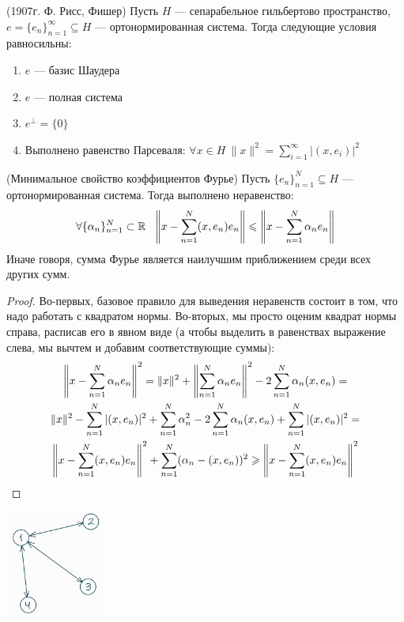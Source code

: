 \begin{theorem} (1907г. Ф. Рисс, Фишер)
	Пусть $H$ --- сепарабельное гильбертово пространство, $e = \{e_n\}_{n = 1}^\infty \subseteq H$ --- ортонормированная система. Тогда следующие условия равносильны:
	\begin{enumerate}
		\item $e$ --- базис Шаудера
		
		\item $e$ --- полная система
		
		\item $e^\bot = \{0\}$
		
		\item Выполнено равенство Парсеваля: $\forall x \in H\ \|x\|^2 = \sum_{i = 1}^\infty |(x, e_i)|^2$
	\end{enumerate}
\end{theorem}

\begin{lemma} (Минимальное свойство коэффициентов Фурье)
	Пусть $\{e_n\}_{n = 1}^N \subseteq H$ --- ортонормированная система. Тогда выполнено неравенство:
	\[
	\forall \{\alpha_n\}_{n = 1}^N \subset \R\ \ \no{x - \sum_{n = 1}^N (x, e_n)e_n} \le \no{x - \sum_{n = 1}^N \alpha_n e_n}
	\]
	Иначе говоря, сумма Фурье является наилучшим приближением среди всех других сумм.
\end{lemma}

\begin{proof}
	Во-первых, базовое правило для выведения неравенств состоит в том, что надо работать с квадратом нормы. Во-вторых, мы просто оценим квадрат нормы справа, расписав его в явном виде (а чтобы выделить в равенствах выражение слева, мы вычтем и добавим соответствующие суммы):
	\begin{multline*}
	\left\|x - \sum_{n = 1}^N \alpha_n e_n\right\|^2 = \|x\|^2 + \left\|\sum_{n = 1}^N \alpha_n e_n\right\|^2 - 2\sum_{n = 1}^N \alpha_n (x, e_n) =
	\\
	\|x\|^2 - \sum_{n = 1}^N |(x, e_n)|^2 + \sum_{n = 1}^N \alpha_n^2 - 2\sum_{n = 1}^N \alpha_n(x, e_n) + \sum_{n = 1}^N |(x, e_n)|^2 =
	\\
	\left\|x - \sum_{n = 1}^N (x, e_n)e_n\right\|^2 + \sum_{n = 1}^N (\alpha_n - (x, e_n))^2 \geqslant \left\|x - \sum_{n = 1}^N (x, e_n)e_n\right\|^2
	\end{multline*}
\end{proof}

\begin{center}
	\includegraphics[width=0.25\textwidth]{images/2pic.png}
\end{center}


